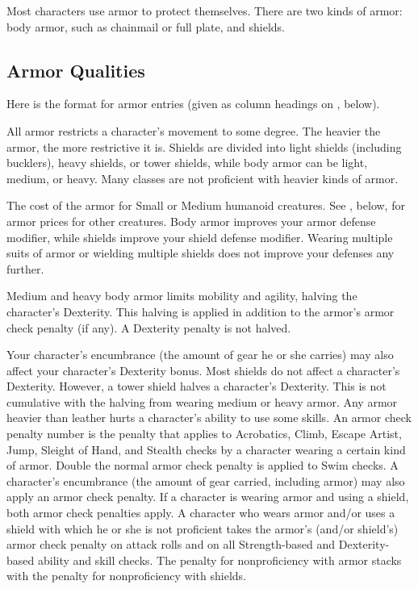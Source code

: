 Most characters use armor to protect themselves. There are two kinds of armor: body armor, such as chainmail or full plate, and shields.

\subsection{Armor Qualities}
\par Here is the format for armor entries (given as column headings on , below).

 All armor restricts a character's movement to some degree. The heavier the armor, the more restrictive it is. Shields are divided into light shields (including bucklers), heavy shields, or tower shields, while body armor can be light, medium, or heavy. Many classes are not proficient with heavier kinds of armor.

 The cost of the armor for Small or Medium humanoid
creatures. See , below, for armor prices for other creatures.
 Body armor improves your armor defense modifier, while shields improve your shield defense modifier. Wearing multiple suits of armor or wielding multiple shields does not improve your defenses any further.

 Medium and heavy body armor limits mobility and agility, halving the character's Dexterity. This halving is applied in addition to the armor's armor check penalty (if any). A Dexterity penalty is not halved.

Your character's encumbrance (the amount of gear he or she carries) may also affect your character's Dexterity bonus.
 Most shields do not affect a character's Dexterity. However, a tower shield halves a character's Dexterity. This is not cumulative with the halving from wearing medium or heavy armor.
 Any armor heavier than leather hurts a character's ability to use some skills. An armor check penalty number is the penalty that applies to Acrobatics, Climb, Escape Artist, Jump, Sleight of Hand, and Stealth checks by a character wearing a certain kind of armor. Double the normal armor check penalty is applied to Swim checks. A character's encumbrance (the amount of gear carried, including armor) may also apply an armor check penalty.
 If a character is wearing armor and using a shield, both armor check penalties apply.
 A character who wears armor and/or uses a shield with which he or she is not proficient takes the armor's (and/or shield's) armor check penalty on attack rolls and on all Strength-based and Dexterity-based ability and skill checks. The penalty for nonproficiency with armor stacks with the penalty for nonproficiency with shields.

